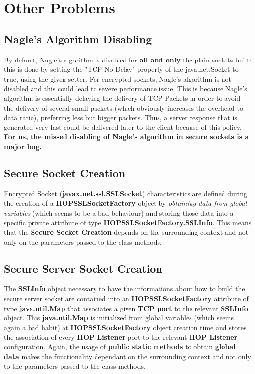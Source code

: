 \section{Other Problems}

\subsection{Nagle's Algorithm Disabling}
By default, Nagle's algorithm is disabled for \textbf{all and only} the plain sockets built: this is done by setting the "TCP No Delay" property of the java.net.Socket to true, using the given setter.
For encrypted sockets, Nagle's algorithm is not disabled and this could lead to severe performance issue.
This is because Nagle's algorithm is essentially delaying the delivery of TCP Packets in order to avoid the delivery of several small packets (which obviously increases the overhead to data ratio), preferring less but bigger packets.
Thus, a server response that is generated very fast could be delivered later to the client because of this policy.
\textbf{For us, the missed disabling of Nagle's algorithm in secure sockets is a major bug.}

\subsection{Secure Socket Creation}
Encrypted Socket (\textbf{javax.net.ssl.SSLSocket}) characteristics are defined during the creation of a \textbf{IIOPSSLSocketFactory} object by \textit{obtaining data from global variables} (which seems to be a bad behaviour) and storing those data into a specific private attribute of type \textbf{IIOPSSLSocketFactory.SSLInfo}.
This means that the \textbf{Secure Socket Creation} depends on the surrounding context and not only on the parameters passed to the class methods.

\subsection{Secure Server Socket Creation}
The \textbf{SSLInfo} object necessary to have the informations about how to build the secure server socket are contained into an \textbf{IIOPSSLSocketFactory} attribute of type \textbf{java.util.Map} that associates a given \textbf{TCP port} to the relevant \textbf{SSLInfo} object.
This \textbf{java.util.Map} is initialized from global variables (which seems again a bad habit) at \textbf{IIOPSSLSocketFactory} object creation time and stores the association of every \textbf{IIOP Listener} port to the relevant \textbf{IIOP Listener} configuration.
Again, the usage of \textbf{public static methods} to obtain \textbf{global data} makes the functionality dependant on the surrounding context and not only to the parameters passed to the class methods.

